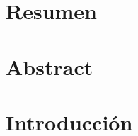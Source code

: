 \documentclass[a4paper,12pt, twoside, openright,makeidx]{book}
\newcommand\blankpage{%
    \null
    \thispagestyle{empty}%
    \addtocounter{page}{-1}%
    \newpage}
\begin{document}
\tableofcontents{}
\listoffigures

\chapter{Resumen}


\chapter{Abstract}


\chapter{Introducción}




%
%
%
%
%
%
%
%
%
%
%
%



\nocite{*}
\afterpage{\blankpage}	%

\end{document}

